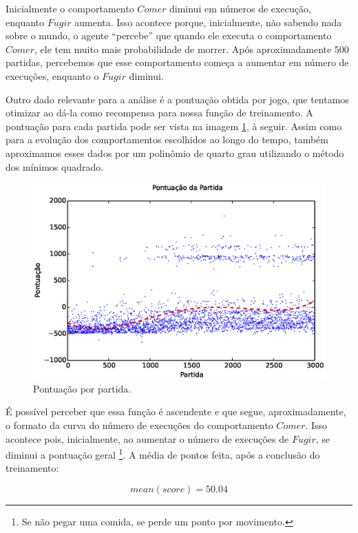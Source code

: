 Inicialmente o comportamento $ Comer $ diminui em números de execução, enquanto $ Fugir $ aumenta. Isso acontece porque, inicialmente, não sabendo nada sobre o mundo, o agente ``percebe'' que quando ele executa o comportamento $ Comer $, ele tem muito mais probabilidade de morrer. Após aproximadamente 500 partidas, percebemos que esse comportamento começa a aumentar em número de execuções, enquanto o $ Fugir $ diminui.

Outro dado relevante para a análise é a pontuação obtida por jogo, que tentamos otimizar ao dá-la como recompensa para nossa função de treinamento. A pontuação para cada partida pode ser vista na imagem \ref{img:3ComportamentosMapaPequeno:PontuacaoPorPartida}, à seguir. Assim como para a evolução dos comportamentos escolhidos ao longo do tempo, também aproximamos esses dados por um polinômio de quarto grau utilizando o método dos mínimos quadrado.

\begin{figure}[H]
    \centering
    \includegraphics[width=\linewidth]{images/3_behaviors_small_map/match_scores____pol}
    \caption{Pontuação por partida.}
    \label{img:3ComportamentosMapaPequeno:PontuacaoPorPartida}
\end{figure}

É possível perceber que essa função é ascendente e que segue, aproximadamente, o formato da curva do número de execuções do comportamento $ Comer $. Isso acontece pois, inicialmente, ao aumentar o número de execuções de $ Fugir $, se diminui a pontuação geral%
\footnote{Se não pegar uma comida, se perde um ponto por movimento.%
}. A média de pontos feita, após a conclusão do treinamento:

$$ mean \left( score \right) =50.04 $$

